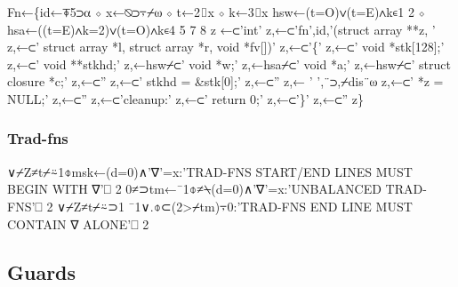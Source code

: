 \documentclass{article}%
\begin{document}
\nwenddocs{}\plusendmoddef\nwstartdeflinemarkup{}\nwenddeflinemarkup
Fn←\{id←⍕5⊃⍺ ⋄ x←⍉⊃⍪⌿⍵ ⋄ t←2⌷x ⋄ k←3⌷x
        hsw←(t=O)∨(t=E)∧k∊1 2 ⋄ hsa←((t=E)∧k=2)∨(t=O)∧k∊4 5 7 8
        z ←⊂'int'
        z,←⊂'fn',id,'(struct array **z, '
        z,←⊂'    struct array *l, struct array *r, void *fv[])'
        z,←⊂'\{'
        z,←⊂'       void    *stk[128];'
        z,←⊂'       void    **stkhd;'
        z,←hsw⌿⊂' void    *w;'
        z,←hsa⌿⊂' void    *a;'
        z,←hsw⌿⊂' struct  closure *c;'
        z,←⊂''
        z,←⊂'       stkhd = &stk[0];'
        z,←⊂''
        z,← ' ',¨⊃,⌿dis¨⍵
        z,←⊂'       *z = NULL;'
        z,←⊂''
        z,←⊂'cleanup:'
        z,←⊂'       return 0;'
        z,←⊂'\}'
        z,←⊂''
z\}
\nwendcode{}\nwdocspar

\subsubsection{Trad-fns}

\nwenddocs{}\endmoddef\nwstartdeflinemarkup{}\nwenddeflinemarkup
∨⌿Z≠t⌿⍨1⌽msk←(d=0)∧'∇'=x:'TRAD-FNS START/END LINES MUST BEGIN WITH ∇'⎕ 2
0≠⊃tm←¯1⌽≠⍀(d=0)∧'∇'=x:'UNBALANCED TRAD-FNS'⎕ 2
∨⌿Z≠t⌿⍨⊃1 ¯1∨.⌽⊂(2>⌿tm)⍪0:'TRAD-FNS END LINE MUST CONTAIN ∇ ALONE'⎕ 2
\nwendcode{}\nwdocspar

\subsection{Guards}
\end{document}
